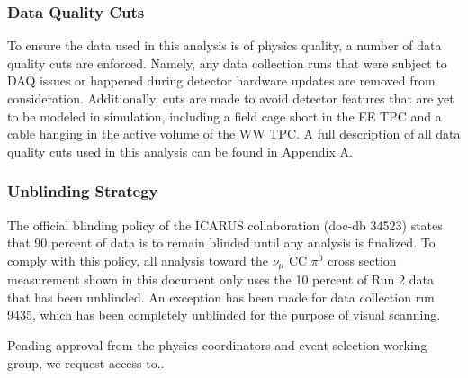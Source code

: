 \documentclass[../main.tex]{subfiles}
\begin{document}
\subsubsection{Data Quality Cuts}
To ensure the data used in this analysis is of physics quality, a number of data quality cuts are enforced.  Namely, any data collection runs that were subject to DAQ issues or happened during detector hardware updates are removed from consideration.  Additionally, cuts are made to avoid detector features that are yet to be modeled in simulation, including a field cage short in the EE TPC and a cable hanging in the active volume of the WW TPC.  A full description of all data quality cuts used in this analysis can be found in Appendix A.

\subsubsection{Unblinding Strategy}
The official blinding policy of the ICARUS collaboration (doc-db 34523) states that 90 percent of data is to remain blinded until any analysis is finalized.  To comply with this policy, all analysis toward the $\nu_{\mu}$ CC $\pi^{0}$ cross section measurement shown in this document only uses the 10 percent of Run 2 data that has been unblinded.  An exception has been made for data collection run 9435, which has been completely unblinded for the purpose of visual scanning.

Pending approval from the physics coordinators and event selection working group, we request access to..
\end{document}

